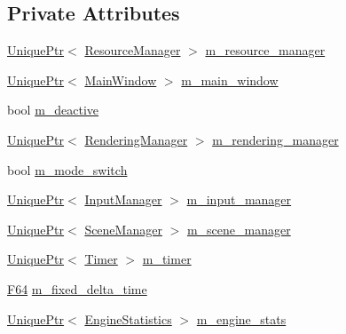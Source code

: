 \subsection*{Private Attributes}
\begin{DoxyCompactItemize}
\item 
\hyperlink{namespacemage_a3316d7143a973e37adf1110f2e80ca31}{Unique\+Ptr}$<$ \hyperlink{classmage_1_1_resource_manager}{Resource\+Manager} $>$ \hyperlink{classmage_1_1_engine_ac8d94579e72983a99a78be6b9b606a28}{m\+\_\+resource\+\_\+manager}
\item 
\hyperlink{namespacemage_a3316d7143a973e37adf1110f2e80ca31}{Unique\+Ptr}$<$ \hyperlink{classmage_1_1_main_window}{Main\+Window} $>$ \hyperlink{classmage_1_1_engine_a3aea7e8c0c1247cac570334a3d3543d6}{m\+\_\+main\+\_\+window}
\item 
bool \hyperlink{classmage_1_1_engine_ab8a4b0157403708ae7d1d018a95b4c63}{m\+\_\+deactive}
\item 
\hyperlink{namespacemage_a3316d7143a973e37adf1110f2e80ca31}{Unique\+Ptr}$<$ \hyperlink{classmage_1_1_rendering_manager}{Rendering\+Manager} $>$ \hyperlink{classmage_1_1_engine_a81c7475c3501f84f9bd9c7bbeaebfcb6}{m\+\_\+rendering\+\_\+manager}
\item 
bool \hyperlink{classmage_1_1_engine_aa5cb2e0b7bb2c4a9020e79ab832ee221}{m\+\_\+mode\+\_\+switch}
\item 
\hyperlink{namespacemage_a3316d7143a973e37adf1110f2e80ca31}{Unique\+Ptr}$<$ \hyperlink{classmage_1_1_input_manager}{Input\+Manager} $>$ \hyperlink{classmage_1_1_engine_a8e9048208a6a5c5b034aaa1cbdab28bc}{m\+\_\+input\+\_\+manager}
\item 
\hyperlink{namespacemage_a3316d7143a973e37adf1110f2e80ca31}{Unique\+Ptr}$<$ \hyperlink{classmage_1_1_scene_manager}{Scene\+Manager} $>$ \hyperlink{classmage_1_1_engine_afac8085ae572d623e77b1e0847440ab4}{m\+\_\+scene\+\_\+manager}
\item 
\hyperlink{namespacemage_a3316d7143a973e37adf1110f2e80ca31}{Unique\+Ptr}$<$ \hyperlink{classmage_1_1_timer}{Timer} $>$ \hyperlink{classmage_1_1_engine_a4daac998928a6c087b310c52b3f26ae4}{m\+\_\+timer}
\item 
\hyperlink{namespacemage_ad26233bbec640deda836e572c1a23708}{F64} \hyperlink{classmage_1_1_engine_a95557e1b6cba52b393c94d80d80bea4c}{m\+\_\+fixed\+\_\+delta\+\_\+time}
\item 
\hyperlink{namespacemage_a3316d7143a973e37adf1110f2e80ca31}{Unique\+Ptr}$<$ \hyperlink{classmage_1_1_engine_statistics}{Engine\+Statistics} $>$ \hyperlink{classmage_1_1_engine_aa0c82f248a2fbec3fbf778665a440edc}{m\+\_\+engine\+\_\+stats}
\end{DoxyCompactItemize}
